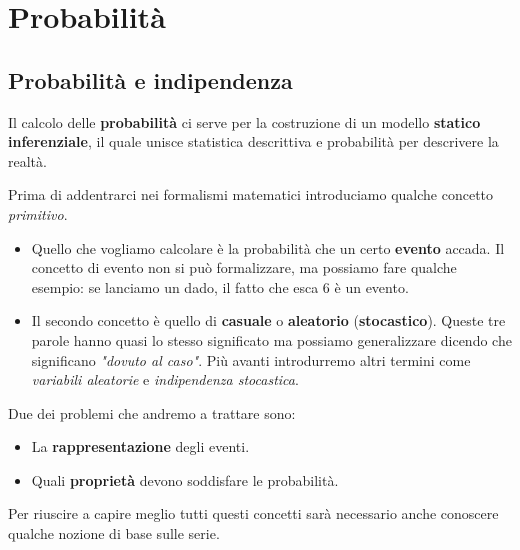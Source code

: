 \part{Probabilità}

\chapter{Probabilità e indipendenza}
Il calcolo delle \textbf{probabilità} ci serve per la costruzione di un modello
\textbf{statico inferenziale}, il quale unisce statistica descrittiva e probabilità per descrivere la
realtà.

Prima di addentrarci nei formalismi matematici introduciamo qualche concetto \emph{primitivo}.
\begin{itemize}
	\item Quello che vogliamo calcolare è la probabilità che un certo \textbf{evento} accada. Il concetto
	      di evento non si può formalizzare, ma possiamo fare qualche esempio: se lanciamo un dado, il
	      fatto che esca 6 è un evento.
	\item Il secondo concetto è quello di \textbf{casuale} o \textbf{aleatorio} (\textbf{stocastico}).
	      Queste tre parole hanno quasi lo stesso significato ma possiamo generalizzare dicendo che
	      significano \emph{"dovuto al caso"}. Più avanti introdurremo altri termini come
	      \emph{variabili aleatorie} e \emph{indipendenza stocastica}.
\end{itemize}
Due dei problemi che andremo a trattare sono:
\begin{itemize}
	\item La \textbf{rappresentazione} degli eventi.
	\item Quali \textbf{proprietà} devono soddisfare le probabilità.
\end{itemize}
Per riuscire a capire meglio tutti questi concetti sarà necessario anche conoscere qualche nozione di base
sulle serie.